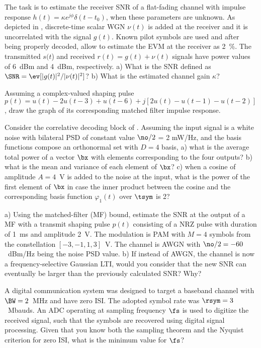 \begin{exercises}
\item The task is to estimate the receiver SNR of a flat-fading channel with impulse response $h(t) = \kappa e^{j \phi} \delta(t-t_0)$, when these parameters are unknown. As depicted in , discrete-time scalar WGN $\nu(t)$ is added at the receiver and it is uncorrelated with the signal $g(t)$. Known pilot symbols are used and after being properly decoded, allow to estimate the EVM at the receiver as 2~\%. The transmitted $s(t$) and received $r(t)=g(t) + \nu(t)$ signals have power values of 6~dBm and 4~dBm, respectively. a) What is the SNR defined as $\SNR = \ev[|g(t)|^2/|\nu(t)|^2]$? b) What is the estimated channel gain $\kappa$?

\item Assuming a complex-valued shaping pulse $p(t) = u(t) - 2u(t-3) + u(t-6) + j [2u(t) - u(t-1) - u(t-2)]$, draw the graph of its corresponding matched filter impulse response.

\item Consider the correlative decoding block of . Assuming the input signal is a white noise with bilateral PSD of constant value $\no / 2$ = 2 mW/Hz, and the basis functions compose an orthonormal set with $D=4$ basis, a) what is the average total power of a vector $\bx$ with elements corresponding to the four outputs? b) what is the mean and variance of each element of $\bx$? c) when a cosine of amplitude $A=4$~V is added to the noise at the input, what is the power of the first element of $\bx$ in case the inner product between the cosine and the corresponding basis function $\varphi_1(t)$ over $\tsym$ is 2?

\item a) Using the matched-filter (MF) bound, estimate the SNR at the output of a MF with a transmit shaping pulse
$p(t)$ consisting of a NRZ pulse with duration of 1~ms and amplitude 2~V. The modulation is PAM with $M=4$ symbols from the constellation $[-3, -1, 1, 3]$~V. The channel is AWGN with $\no/2=-60$~dBm/Hz being the noise PSD value. b) If instead of AWGN, the channel is now a frequency-selective Gaussian LTI, would you consider that the new SNR can eventually be larger than the previously calculated SNR? Why?

\item A digital communication system was designed to target a baseband channel with $\BW=2$~MHz and have zero ISI. The adopted symbol rate was $\rsym = 3$~Mbauds. An ADC operating at sampling frequency $\fs$ is used to digitize the received signal, such that the symbols are recovered using digital signal processing. Given that you know both the sampling theorem and the Nyquist criterion for zero ISI, what is the minimum value for $\fs$?


\end{exercises}
